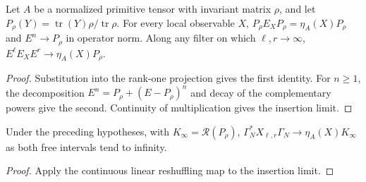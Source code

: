 \begin{lemma}
    \label{thm:primitive_insertion_transfer_limit}
    \leanok
    Let $A$ be a normalized primitive tensor with invariant matrix $\rho$,
    and let $P_\rho(Y)=\operatorname{tr}(Y)\rho/\operatorname{tr}\rho$.
    For every local observable $X$,
    $P_\rho E_XP_\rho=\eta_A(X)P_\rho$ and $E^n\to P_\rho$ in operator norm.
    Along any filter on which $\ell,r\to\infty$,
    $E^\ell E_XE^r\to\eta_A(X)P_\rho$.
\end{lemma}
\begin{proof}\leanok
    Substitution into the rank-one projection gives the first identity.
    For $n\geq1$, the decomposition
    $E^n=P_\rho+(E-P_\rho)^n$ and decay of the complementary powers
    give the second. Continuity of multiplication gives the insertion limit.
\end{proof}

\begin{lemma}
    \label{thm:primitive_insertion_gram_limit}
    \leanok
    Under the preceding hypotheses, with $K_\infty=\mathcal R(P_\rho)$,
    $\Gamma_N^*X_{\ell,r}\Gamma_N\to\eta_A(X)K_\infty$ as both
    free intervals tend to infinity.
\end{lemma}
\begin{proof}\leanok
    Apply the continuous linear reshuffling map to the insertion limit.
\end{proof}

